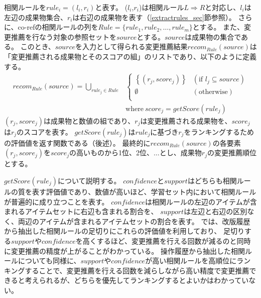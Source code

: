 \documentclass[a4paper]{jsbook}
\def\Ra{\Rightarrow}
\newcommand{\confidence}{con\!f\!idence}
\newcommand{\getScore}{getS\!core}
\begin{document}
相関ルールを$rule_i = (l_i,r_i)$と表す。
($l_i$,$r_i$)は相関ルール$L \Ra R$と対応し、$l_i$は左辺の成果物集合、$r_i$は右辺の成果物を表す（\ref{extractrules_sec}節参照）。
さらに、co-refの相関ルールの列を$Rule = \{rule_1, rule_2, \dots, rule_m\}$とする。
また、変更推薦を行なう対象の参照セットを$source$とする。$source$は成果物の集合である。
このとき、$source$を入力として得られる変更推薦結果$recom_{Rule}(source)$は「変更推薦される成果物とそのスコアの組」のリストであり、以下のように定義する。
\begin{eqnarray}
  recom_{Rule}\left(source\right) = \bigcup_{rule_j \in Rule}
    &\left\{
    \begin{array}{ll}
      \left\{\left(r_j,score_j \right)\right\} &(\textrm{if~} l_j \subseteq source) \\
      \emptyset &(\textrm{otherwise})\\
    \end{array}
    \right.\\
    &\textrm{where}~score_j = \getScore(rule_j)\nonumber
\end{eqnarray}
$\left(r_j,score_j\right)$は成果物と数値の組であり、$r_j$は変更推薦される成果物を、$score_j$は$r_j$のスコアを表す。
$\getScore(rule_j)$は$rule_j$に基づき$r_j$をランキングするための評価値を返す関数である（後述）。
最終的に$recom_{Rule}(source)$の各要素$(r_j,score_j)$を$score_j$の高いものから1位、2位、$\dots$とし、成果物$r_j$の変更推薦順位とする。

$\getScore(rule_j)$について説明する。
$\confidence$と$support$はどちらも相関ルールの質を表す評価値であり、数値が高いほど、学習セット内において相関ルールが普遍的に成り立つことを表す。
$\confidence$は相関ルールの左辺のアイテムが含まれるアイテムセットに右辺も含まれる割合を、
$support$は左辺と右辺の区別なく、両辺のアイテムが含まれるアイテムセットの割合を表す。
\cite{Zimmermann:2005}では、改版履歴から抽出した相関ルールの足切りにこれらの評価値を利用しており、
足切りする$support$や$\confidence$を高くするほど、変更推薦を行える回数が減るのと同時に変更推薦の精度が上がることがわかっている。
操作履歴から抽出した相関ルールについても同様に、$support$や$\confidence$が高い相関ルールを高順位にランキングすることで、変更推薦を行える回数を減らしながら高い精度で変更推薦できると考えられるが、どちらを優先してランキングするとよいかはわかっていない。
\end{document}
